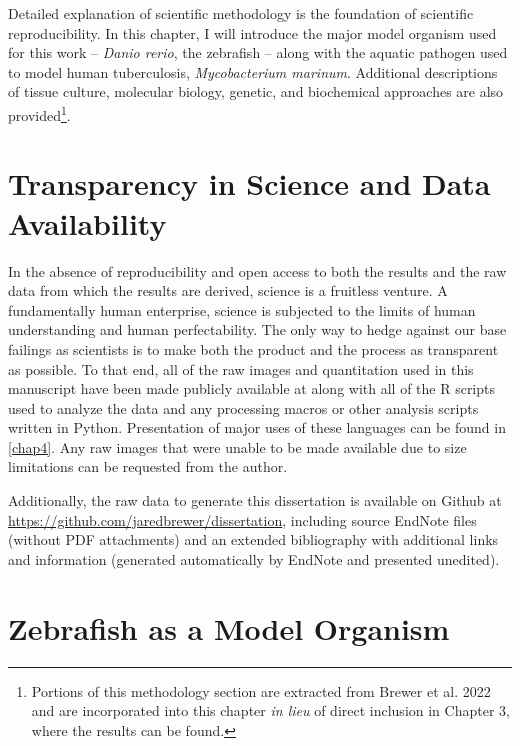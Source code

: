 Detailed explanation of scientific methodology is the foundation of scientific reproducibility. In this chapter, I will introduce the major model organism used for this work -- \textit{Danio rerio}, the zebrafish -- along with the aquatic pathogen used to model human tuberculosis, \textit{Mycobacterium marinum}. Additional descriptions of tissue culture, molecular biology, genetic, and biochemical approaches are also provided\footnote{Portions of this methodology section are extracted from Brewer et al. 2022 and are incorporated into this chapter \textit{in lieu} of direct inclusion in Chapter 3, where the results can be found.}. 

\section{Transparency in Science and Data Availability}\label{transparency}

In the absence of reproducibility and open access to both the results and the raw data from which the results are derived, science is a fruitless venture. A fundamentally human enterprise, science is subjected to the limits of human understanding and human perfectability. The only way to hedge against our base failings as scientists is to make both the product and the process as transparent as possible. To that end, all of the raw images and quantitation used in this manuscript have been made publicly available at \href{https://doi.org/10.5281/zenodo.6816429}{\citet{NFATZenodo}} along with all of the R scripts used to analyze the data and any processing macros or other analysis scripts written in Python. Presentation of major uses of these languages can be found in \autoref{chap4}. Any raw images that were unable to be made available due to size limitations can be requested from the author. 

Additionally, the raw data to generate this dissertation is available on Github at \url{https://github.com/jaredbrewer/dissertation}, including source EndNote files (without PDF attachments) and an extended bibliography with additional links and information (generated automatically by EndNote and presented unedited).

\section{Zebrafish as a Model Organism}\label{zebrafish}

